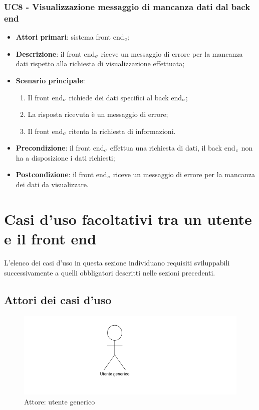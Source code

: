 \subsubsection{UC8 - Visualizzazione messaggio di mancanza dati dal back end}\label{CasiDUsoCasiDUsoTraIlFrontEndEIlBackEndElencoDeiCasiDUsoUC8VisualizzazioneMessaggioDiMancanzaDatiDalBackEnd}
\begin{itemize}
	\item \textbf{Attori primari}: sistema front end$_{\scaleto{G}{3pt}}$;
	\item \textbf{Descrizione}: il front end$_{\scaleto{G}{3pt}}$ riceve un messaggio di errore per la mancanza dati rispetto alla richiesta di visualizzazione effettuata;
	\item \textbf{Scenario principale}: 
	\begin{enumerate}
		\item Il front end$_{\scaleto{G}{3pt}}$ richiede dei dati specifici al back end$_{\scaleto{G}{3pt}}$;
		\item La risposta ricevuta è un messaggio di errore;
		\item Il front end$_{\scaleto{G}{3pt}}$ ritenta la richiesta di informazioni. 
	\end{enumerate}
	\item \textbf{Precondizione}: il front end$_{\scaleto{G}{3pt}}$ effettua una richiesta di dati, il back end$_{\scaleto{G}{3pt}}$ non ha a disposizione i dati richiesti;
	\item \textbf{Postcondizione}: il front end$_{\scaleto{G}{3pt}}$ riceve un messaggio di errore per la mancanza dei dati da visualizzare. 
\end{itemize}

\section{Casi d'uso facoltativi tra un utente e il front end}\label{CasiDUsoCasiDUsoFacoltativiTraUnUtenteEIlFrontEnd}
L'elenco dei casi d'uso in questa sezione individuano requisiti sviluppabili successivamente a quelli obbligatori descritti nelle sezioni precedenti.
\subsection{Attori dei casi d'uso}
\begin{center}
	\begin{figure}[H]
		\includegraphics{../immagini/attori_casi/utente_generico.png}
		\caption{Attore: utente generico}
	\end{figure}
\end{center}
